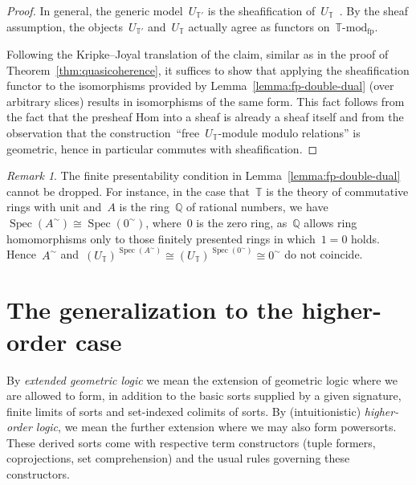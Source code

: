 \documentclass[oneside,reqno]{amsart}
\theoremstyle{definition}
\theoremstyle{plain}
\theoremstyle{remark}
\newtheorem{rem}[defn]{Remark}
\newcommand{\TT}{\mathbb{T}}
\newcommand{\QQ}{\mathbb{Q}}
\DeclareMathOperator{\Spec}{Spec}
\renewcommand{\_}{\mathpunct{.}\,}
\newcommand{\?}{\,{:}\,}
\newcommand{\Mod}[1]{{#1}\mathrm{\text{-}mod}}
\begin{document}
\begin{proof}In general, the generic model~$U_{\TT'}$ is the sheafification
of~$U_\TT$~\cite[Lemma~2.3]{caramello:definability}. By the sheaf assumption,
the objects~$U_{\TT'}$ and~$U_\TT$ actually agree as functors
on~$\Mod{\TT}_\mathrm{fp}$.

Following the Kripke--Joyal translation of the claim, similar as in the proof
of Theorem~\ref{thm:quasicoherence}, it suffices to show that
applying the sheafification functor to the isomorphisms provided by
Lemma~\ref{lemma:fp-double-dual} (over arbitrary slices) results in
isomorphisms of the same form. This fact follows from the fact that
the presheaf Hom into a sheaf is already a sheaf itself and
from the observation that the construction~``free~$U_\TT$-module modulo
relations'' is geometric, hence in particular commutes with sheafification.
\end{proof}


\begin{rem}The finite presentability condition in
Lemma~\ref{lemma:fp-double-dual} cannot be dropped. For instance, in the case
that~$\TT$ is the theory of commutative rings with unit and~$A$ is the
ring~$\QQ$ of rational numbers, we have~$\Spec(A^\sim) \cong \Spec(0^\sim)$, where~$0$
is the zero ring, as~$\QQ$ allows ring homomorphisms only to those finitely
presented rings in which~$1 = 0$ holds. Hence~$A^\sim$
and~$(U_\TT)^{\Spec(A^\sim)} \cong (U_\TT)^{\Spec(0^\sim)} \cong 0^\sim$ do not coincide.
\end{rem}


\section{The generalization to the higher-order case}
\label{sect:higher-order}


By \emph{extended geometric logic} we mean the extension of geometric logic
where we are allowed to form, in addition to the basic sorts supplied by
a given signature, finite limits of sorts and set-indexed colimits of sorts. By
(intuitionistic) \emph{higher-order logic}, we mean the further extension where
we may also form powersorts. These derived sorts come with respective term
constructors (tuple formers, coprojections, set comprehension) and the usual
rules governing these constructors.
\end{document}
